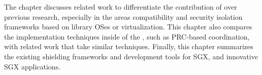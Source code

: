 The chapter discusses related work to differentiate the contribution of \graphene{}
over previous research,
especially in the areas compatibility and security isolation frameworks
based on library OSes or virtualization.
This chapter also compares the implementation techniques inside of the \libos{},
such as PRC-based coordination,
with related work that take similar techniques.
Finally, this chapter summarizes
the existing shielding frameworks and development tools for SGX,
and innovative SGX applications.

